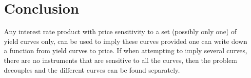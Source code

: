 \section{Conclusion}
Any interest rate product with price sensitivity to a set (possibly only one) of yield curves only, can be used to imply these curves provided one can write down a function from yield curves to price.  If when attempting to imply several curves, there are no instruments that are sensitive to all the curves, then the problem decouples and the different curves can be found separately.

